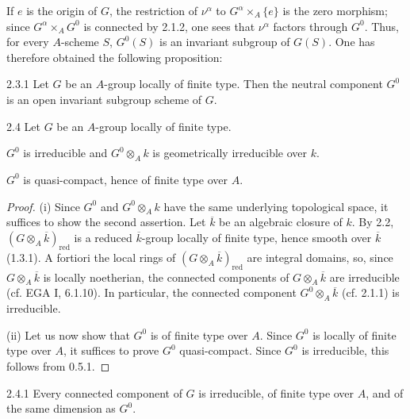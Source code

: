 If $e$ is the origin of $G$, the restriction of $\nu^\alpha$ to $G^\alpha\times_A\{e\}$ is the zero morphism; since $G^\alpha\times_AG^0$ is connected by 2.1.2, one sees that $\nu^\alpha$ factors through $G^0$. Thus, for every $A$-scheme $S$, $G^0(S)$ is an invariant subgroup of $G(S)$. One has therefore obtained the following proposition:
\begin{proposition}{2.3.1}\label{VIA.2.3.1}
Let $G$ be an $A$-group locally of finite type. Then the neutral component $G^0$ is an open invariant subgroup scheme of $G$.
\end{proposition}
\begin{proposition}{2.4}\label{VIA.2.4}
Let $G$ be an $A$-group locally of finite type.
\begin{enumeratei}
\item $G^0$ is irreducible and $G^0\otimes_Ak$ is geometrically irreducible over $k$.
\item $G^0$ is quasi-compact, hence of finite type over $A$.
\end{enumeratei}
\end{proposition}
\begin{proof}
(i) Since $G^0$ and $G^0\otimes_Ak$ have the same underlying topological space, it suffices to show the second assertion. Let $\overline k$ be an algebraic closure of $k$. By 2.2, $(G\otimes_A\overline k)_{\mathrm{red}}$ is a reduced $\overline k$-group locally of finite type, hence smooth over $\overline k$ (1.3.1). A fortiori the local rings of $(G\otimes_A\overline k)_{\mathrm{red}}$ are integral domains, so, since $G\otimes_A\overline k$ is locally noetherian, the connected components of $G\otimes_A\overline k$ are irreducible (cf. EGA I, 6.1.10). In particular, the connected component $G^0\otimes_A\overline k$ (cf. 2.1.1) is irreducible.

(ii) Let us now show that $G^0$ is of finite type over $A$. Since $G^0$ is locally of finite type over $A$, it suffices to prove $G^0$ quasi-compact. Since $G^0$ is irreducible, this follows from 0.5.1.
\end{proof}
\begin{corollary}{2.4.1}\label{VIA.2.4.1}
Every connected component of $G$ is irreducible, of finite type over $A$, and of the same dimension as $G^0$.
\end{corollary}
